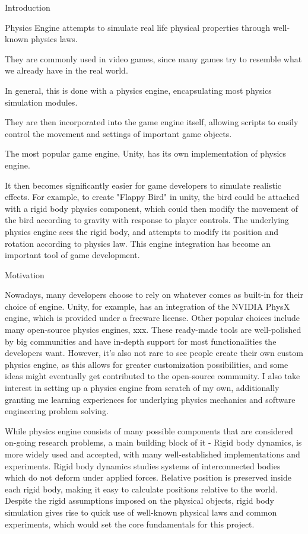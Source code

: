 Introduction


Physics Engine attempts to simulate real life physical properties through well-known physics laws.

They are commonly used in video games, since many games try to resemble what we already have in the real world.

In general, this is done with a physics engine, encapsulating most physics simulation modules.

They are then incorporated into the game engine itself, allowing scripts to easily control the movement and settings of important game objects.

The most popular game engine, Unity, has its own implementation of physics engine.

It then becomes significantly easier for game developers to simulate realistic effects. For example, to create "Flappy Bird" in unity, the bird could be attached with a rigid body physics component, which could then modify the movement of the bird according to gravity with response to player controls. The underlying physics engine sees the rigid body, and attempts to modify its position and rotation according to physics law. This engine integration has become an important tool of game development.

Motivation

Nowadays, many developers choose to rely on whatever comes as built-in for their choice of engine. Unity, for example, has an integration of the NVIDIA PhysX engine, which is provided under a freeware license. Other popular choices include many open-source physics engines, xxx. These ready-made tools are well-polished by big communities and have in-depth support for most functionalities the developers want. However, it's also not rare to see people create their own custom physics engine, as this allows for greater customization possibilities, and some ideas might eventually get contributed to the open-source community. I also take interest in setting up a physics engine from scratch of my own, additionally granting me learning experiences for underlying physics mechanics and software engineering problem solving.

While physics engine consists of many possible components that are considered on-going research problems, a main building block of it - Rigid body dynamics, is more widely used and accepted, with many well-established implementations and experiments. Rigid body dynamics studies systems of interconnected bodies which do not deform under applied forces. Relative position is preserved inside each rigid body, making it easy to calculate positions relative to the world. Despite the rigid assumptions imposed on the physical objects, rigid body simulation gives rise to quick use of well-known physical laws and common experiments, which would set the core fundamentals for this project.
